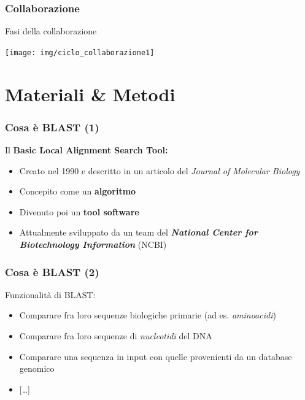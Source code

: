 \begin{frame}\frametitle{Collaborazione}

\begin{center}
\Large{Fasi della collaborazione}
\end{center}

\vspace{.5cm}

\begin{center}
    \texttt{[image: img/ciclo\_collaborazione1]}
\end{center}

\end{frame}

\section{Materiali \& Metodi}

\begin{frame}\frametitle{Cosa è BLAST (1)}

Il
\textbf{\alert{B}asic \alert{L}ocal \alert{A}lignment \alert{S}earch \alert{T}ool:}

\begin{itemize}[<+->]
\itemsep1pt\parskip0pt
\item
  Creato nel 1990 e descritto in un articolo del \emph{Journal of
  Molecular Biology}
\item
  Concepito come un \textbf{algoritmo}
\item
  Divenuto poi un \textbf{tool software}
\item
  Attualmente sviluppato da un team del \emph{\textbf{National Center
  for Biotechnology Information}} (NCBI)
\end{itemize}

\end{frame}

\begin{frame}\frametitle{Cosa è BLAST (2)}

Funzionalità di BLAST:

\begin{itemize}[<+->]
\itemsep1pt\parskip0pt
\item
  Comparare fra loro sequenze biologiche primarie (ad es.
  \emph{aminoacidi})
\item
  Comparare fra loro sequenze di \emph{nucleotidi} del DNA
\item
  Comparare una sequenza in input con quelle provenienti da un database
  genomico
\item
  {[}\ldots{]}
\end{itemize}

\end{frame}

